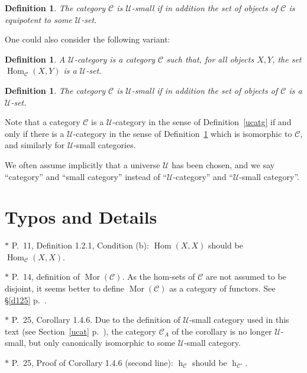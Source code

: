 \documentclass[12pt]{article}%
\newtheorem{df}[thm]{Definition}%
\theoremstyle{remark}
\theoremstyle{definition}
\newcommand{\nn}{\noindent}
\newcommand{\C}{\mathcal C}
\newcommand{\U}{\mathcal U}
\DeclareMathOperator{\hy}{h}
\DeclareMathOperator{\Hom}{Hom}%
\DeclareMathOperator{\Mor}{Mor}
\begin{document}
\begin{df}
The category $\C$ is $\U$-{\em small} if in addition the set of objects of $\C$ is equipotent to some $\U$-set. 
\end{df} 

One could also consider the following variant: 

\begin{df}\label{ducat}
A $\U$-{\em category} \index{$\U$-category} is a category $\C$ such that, for all objects $X,Y$, the set $\Hom_\C(X,Y)$ is a $\U$-set. 
\end{df} 

\begin{df}\label{small}
The category $\C$ is $\U$-{\em small} if in addition the set of objects of $\C$ is a $\U$-set. 
\end{df} 

Note that a category $\C$ is a $\U$-category in the sense of Definition~\ref{ucatg} if and only if there is a $\U$-category in the sense of Definition~\ref{ducat} which is isomorphic to $\C$, and similarly for $\U$-small categories. 
%
\begin{center}
\end{center}

We often assume implicitly that a universe $\U$ has been chosen, and we say ``category'' and ``small category'' instead of ``$\U$-category'' and ``$\U$-small category''.


\section{Typos and Details}

$*$ P.~11, Definition 1.2.1, Condition (b): $\Hom(X,X)$ should be $\Hom_{\C}(X,X)$. 

\nn$*$ P.~14, definition of $\Mor(\C)$. As the hom-sets of $\C$ are not assumed to be disjoint, it seems better to define $\Mor(\C)$ as a category of functors. See \S\ref{d125} p.~\pageref{d125}. 

\nn$*$ P.~25, Corollary 1.4.6. Due to the definition of $\U$-small category used in this text (see Section~\ref{ucat} p.~\pageref{ucat}), the category $\C_A$ of the corollary is no longer $\U$-small, but only canonically isomorphic to some $\U$-small category. 

\nn$*$ P.~25, Proof of Corollary 1.4.6 (second line): $\hy_{\C}$ should be $\hy_{\C'}$. 
\end{document}
